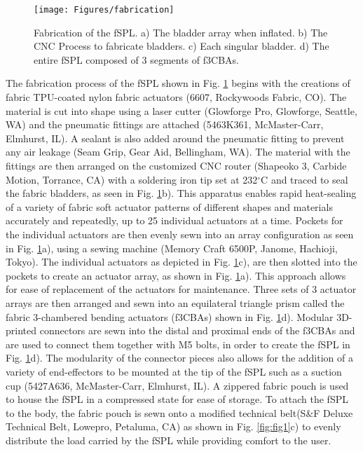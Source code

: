 \documentclass[letterpaper, 10 pt, conference]{ieeeconf}  %
\begin{document}
\begin{figure}[t!]
\centering
\texttt{[image: Figures/fabrication]}
\caption{Fabrication of the fSPL. a) The bladder array when inflated. b) The CNC Process to fabricate bladders. c) Each singular bladder. d) The entire fSPL composed of 3 segments of f3CBAs.}
\label{fig:fabrication}
\vspace{-1.5em}
\end{figure}

The fabrication process of the fSPL shown in Fig. \ref{fig:fabrication} begins with the creations of fabric TPU-coated nylon fabric actuators (6607, Rockywoods Fabric, CO). The material is cut into shape using a laser cutter (Glowforge Pro, Glowforge, Seattle, WA) and the pneumatic fittings are attached (5463K361, McMaster-Carr, Elmhurst, IL). A sealant is also added around the pneumatic fitting to prevent any air leakage (Seam Grip, Gear Aid, Bellingham, WA). The material with the fittings are then arranged on the customized CNC router (Shapeoko 3, Carbide Motion, Torrance, CA) with a soldering iron tip set at 232$^{\circ}$C and traced to seal the fabric bladders, as seen in Fig. \ref{fig:fabrication}b). This apparatus enables rapid heat-sealing of a variety of fabric soft actuator patterns of different shapes and materials accurately and repeatedly, up to 25 individual actuators at a time. Pockets for the individual actuators are then evenly sewn into an array configuration as seen in Fig. \ref{fig:fabrication}a), using a sewing machine (Memory Craft 6500P, Janome, Hachioji, Tokyo). The individual actuators as depicted in Fig. \ref{fig:fabrication}c), are then slotted into the pockets to create an actuator array, as shown in Fig. \ref{fig:fabrication}a). This approach allows for ease of replacement of the actuators for maintenance. Three sets of 3 actuator arrays are then arranged and sewn into an equilateral triangle prism called the fabric 3-chambered bending actuators (f3CBAs) shown in Fig. \ref{fig:fabrication}d). Modular 3D-printed connectors are sewn into the distal and proximal ends of the f3CBAs and are used to connect them together with M5 bolts, in order to create the fSPL in Fig. \ref{fig:fabrication}d). The modularity of the connector pieces also allows for the addition of a variety of end-effectors to be mounted at the tip of the fSPL such as a suction cup (5427A636, McMaster-Carr, Elmhurst, IL). A zippered fabric pouch is used to house the fSPL in a compressed state for ease of storage. To attach the fSPL to the body, the fabric pouch is sewn onto a modified technical belt(S\&F Deluxe Technical Belt, Lowepro, Petaluma, CA) as shown in Fig. \ref{fig:fig1}c) to evenly distribute the load carried by the fSPL while providing comfort to the user. 
\end{document}
